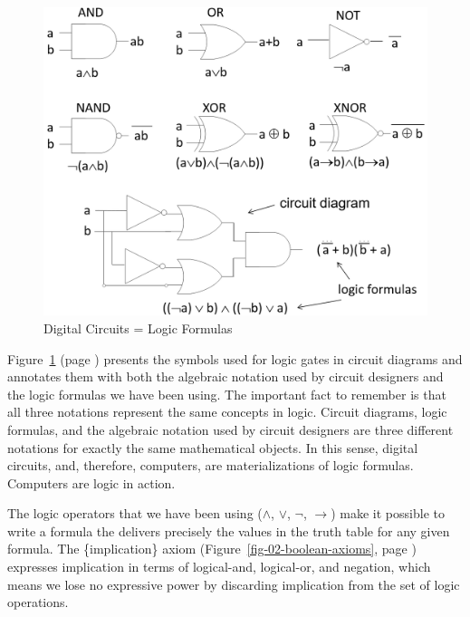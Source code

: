\begin{figure}
\begin{center}
\includegraphics[scale=0.25]{images/LogicGates.png}
\end{center}
\caption{Digital Circuits = Logic Formulas}
\label{fig-02-logic-gates}
\end{figure}

Figure~\ref{fig-02-logic-gates} (page \pageref{fig-02-logic-gates})
presents the symbols used for logic gates in circuit diagrams
and annotates them with both
the algebraic notation used by circuit designers
and the logic formulas we have been using.
The important fact to remember is that all three notations
represent the same concepts in logic. Circuit diagrams, logic formulas,
and the algebraic notation used by circuit designers are three
different notations for exactly the same mathematical objects.
In this sense, digital circuits, and, therefore, computers,
are materializations of logic formulas.
Computers are logic in action.

The logic operators that we have been using
($\wedge$, $\vee$, $\neg$, $\rightarrow$)
make it possible to write a formula
the delivers precisely the values in the truth table
for any given formula.
The \{implication\} axiom
(Figure~\ref{fig-02-boolean-axioms}, page \pageref{fig-02-boolean-axioms})
expresses implication in terms of logical-and, logical-or,
and negation, which means we lose no expressive power by
discarding implication from the set of logic operations.

